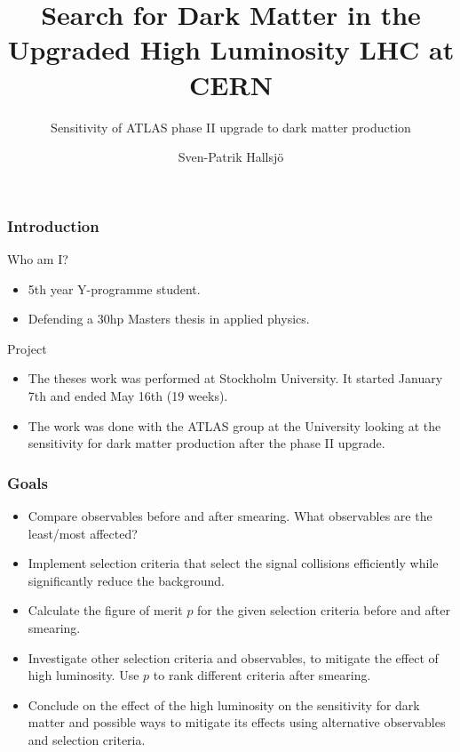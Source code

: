 \documentclass[handout]{beamer}
\title{Search for Dark Matter in the Upgraded High Luminosity LHC at CERN}
\subtitle{Sensitivity of ATLAS phase II upgrade to dark matter production}
\author{Sven-Patrik Hallsj\"{o}}
\begin{document}
\begin{frame}
\titlepage
\end{frame}



\begin{frame}[shrink=10]\frametitle{Introduction}
\begin{block}{Who am I?}
\begin{itemize}
\item 5th year Y-programme student.
\item Defending a 30hp Masters thesis in applied physics.
\end{itemize}
\end{block}
\begin{block}{Project}
\begin{itemize}
\item The theses work was performed at Stockholm University. It started January 7th and ended May 16th (19 weeks).
\item The work was done with the ATLAS group at the University looking at the sensitivity for dark matter production after the phase II upgrade.
\end{itemize}
\end{block}
\end{frame}

\begin{frame}[shrink=10]\frametitle{Goals}
\begin{block}{}
\begin{itemize}
\item Compare observables before and after smearing. What observables are the least/most affected?	
\item Implement selection criteria that select the signal collisions efficiently while significantly reduce the background. 
\item Calculate the figure of merit $p$ for the given selection criteria before and after smearing.
\item Investigate other selection criteria and observables, to mitigate the effect of high luminosity. Use $p$ to rank different criteria after smearing.
\item Conclude on the effect of the high luminosity on the sensitivity for dark matter and possible ways to mitigate its effects using alternative observables and selection criteria. 
\end{itemize}
\end{block}
\end{frame}
\end{document}
